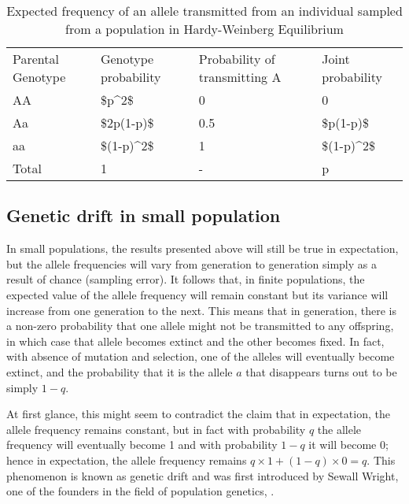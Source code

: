\documentclass[]{book}
\begin{document}
\begin{table}

\caption{\label{tab:HW}Expected frequency of an allele transmitted from an individual sampled from a population in Hardy-Weinberg Equilibrium}
\centering
\begin{tabular}[t]{llll}
\toprule
Parental Genotype & Genotype probability & Probability of transmitting A & Joint probability\\
AA & \$p\textasciicircum{}2\$ & 0 & 0\\
Aa & \$2p(1-p)\$ & 0.5 & \$p(1-p)\$\\
aa & \$(1-p)\textasciicircum{}2\$ & 1 & \$(1-p)\textasciicircum{}2\$\\
Total & 1 & - & p\\
\bottomrule
\end{tabular}
\end{table}

\hypertarget{genetic-drift-in-small-population}{%
\subsection{Genetic drift in small population}\label{genetic-drift-in-small-population}}

In small populations, the results presented above will still be true in
expectation, but the allele frequencies will vary from generation to
generation simply as a result of chance (sampling error). It follows
that, in finite populations, the expected value of the allele frequency
will remain constant but its variance will increase from one generation
to the next. This means that in generation, there is a non-zero
probability that one allele might not be transmitted to any offspring,
in which case that allele becomes extinct and the other becomes fixed.
In fact, with absence of mutation and selection, one of the alleles will
eventually become extinct, and the probability that it is the allele \(a\)
that disappears turns out to be simply \(1 - q\).

At first glance, this might seem to contradict the claim that in
expectation, the allele frequency remains constant, but in fact with
probability \(q\) the allele frequency will eventually become 1 and with
probability \(1 - q\) it will become 0; hence in expectation, the allele
frequency remains \(q \times 1 + (1 - q) \times 0 = q\). This phenomenon
is known as genetic drift and was first introduced by Sewall Wright, one
of the founders in the field of population genetics,
\citep{wright1929evolution}.
\end{document}
